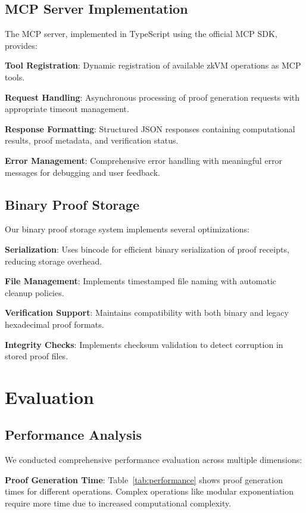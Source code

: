 \documentclass[11pt]{article}
\begin{document}
\subsection{MCP Server Implementation}

The MCP server, implemented in TypeScript using the official MCP SDK, provides:

\textbf{Tool Registration}: Dynamic registration of available zkVM operations as MCP tools.

\textbf{Request Handling}: Asynchronous processing of proof generation requests with appropriate timeout management.

\textbf{Response Formatting}: Structured JSON responses containing computational results, proof metadata, and verification status.

\textbf{Error Management}: Comprehensive error handling with meaningful error messages for debugging and user feedback.

\subsection{Binary Proof Storage}

Our binary proof storage system implements several optimizations:

\textbf{Serialization}: Uses bincode for efficient binary serialization of proof receipts, reducing storage overhead.

\textbf{File Management}: Implements timestamped file naming with automatic cleanup policies.

\textbf{Verification Support}: Maintains compatibility with both binary and legacy hexadecimal proof formats.

\textbf{Integrity Checks}: Implements checksum validation to detect corruption in stored proof files.

\section{Evaluation}
\label{sec:evaluation}

\subsection{Performance Analysis}

We conducted comprehensive performance evaluation across multiple dimensions:

\textbf{Proof Generation Time}: Table~\ref{tab:performance} shows proof generation times for different operations. Complex operations like modular exponentiation require more time due to increased computational complexity.
\end{document}
